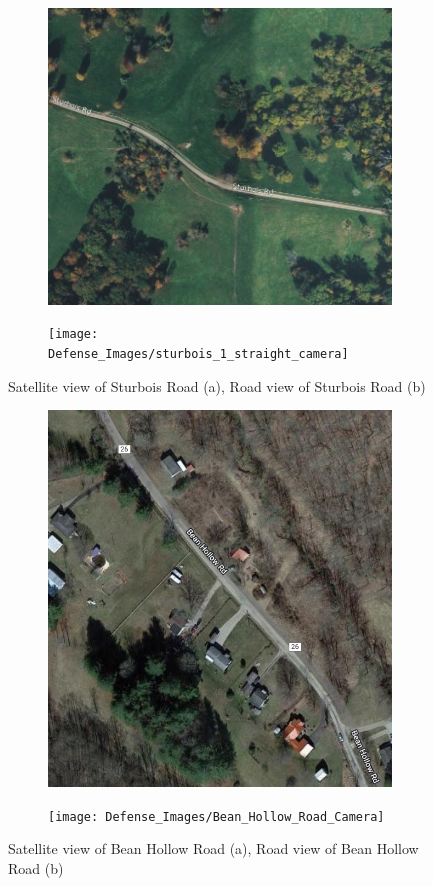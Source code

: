 \documentclass[numbered,pdftex]{ohio-etd}
\begin{document}
{{{{				\begin{figure}[H]
					\centering
					\begin{subfigure}{0.45\textwidth}
						\centering
						\includegraphics[width=1.0\linewidth,height=5.0 cm,keepaspectratio]{Defense_Images/Sturbois_Road}
						\caption[Sturbois Road Satellite View]{}
						\label{fig:Sturbois_Sat_View}
					\end{subfigure}
					\begin{subfigure}{0.45\textwidth}
						\centering
						\texttt{[image: Defense\_Images/sturbois\_1\_straight\_camera]}
						\caption[Sturbois Road Camera View]{}
						\label{fig:Sturbois_Cam_View}
					\end{subfigure}
					\caption[Sturbois Road]{Satellite view of Sturbois Road (a), Road view of Sturbois Road (b)}
					\label{fig:Combined_Sturbois}
				\end{figure}
			
				\begin{figure}[H]
					\centering
					\begin{subfigure}{0.45\textwidth}
						\centering
						\includegraphics[width=1.0\linewidth,height=5.0 cm,keepaspectratio]{Defense_Images/Bean_Hollow_Road}
						\caption[Bean Hollow Road Satellite View]{}
						\label{fig:Bean_Sat_View}
					\end{subfigure}
					\begin{subfigure}{0.45\textwidth}
						\centering
						\texttt{[image: Defense\_Images/Bean\_Hollow\_Road\_Camera]}
						\caption[Bean Hollow Road Camera View]{}
						\label{fig:Bean_Cam_View}
					\end{subfigure}
					\caption[Bean Hollow Road]{Satellite view of Bean Hollow Road (a), Road view of Bean Hollow Road (b)}
					\label{fig:Combined_Bean}
				\end{figure}
						
}}}}
\end{document}
